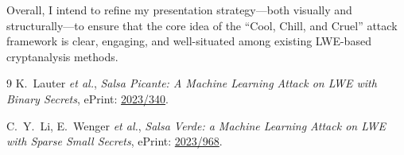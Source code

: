 \documentclass[12pt]{article}
\begin{document}
Overall, I intend to refine my presentation strategy—both visually and structurally—to ensure that the core idea of the “Cool, Chill, and Cruel” attack framework is clear, engaging, and well-situated among existing LWE-based cryptanalysis methods.

\vspace{1em}
\begin{thebibliography}{9}
  K.~Lauter \textit{et al.},
  \emph{Salsa Picante: A Machine Learning Attack on LWE with Binary Secrets}, 
  ePrint: \href{https://eprint.iacr.org/2023/340.pdf}{2023/340}.

  C.~Y.~Li, E.~Wenger \textit{et al.},
  \emph{Salsa Verde: a Machine Learning Attack on LWE with Sparse Small Secrets},
  ePrint: \href{https://eprint.iacr.org/2023/968}{2023/968}.
\end{thebibliography}
\end{document}
